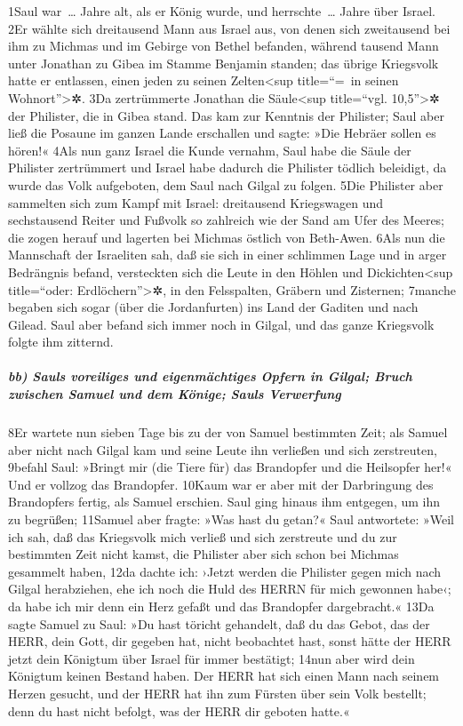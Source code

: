 1Saul war~\ldots{} Jahre alt, als er König wurde, und herrschte~\ldots{}
Jahre über Israel. 2Er wählte sich dreitausend Mann aus Israel aus, von
denen sich zweitausend bei ihm zu Michmas und im Gebirge von Bethel
befanden, während tausend Mann unter Jonathan zu Gibea im Stamme
Benjamin standen; das übrige Kriegsvolk hatte er entlassen, einen jeden
zu seinen Zelten\textless sup title=``=~in seinen
Wohnort''\textgreater✲. 3Da zertrümmerte Jonathan die Säule\textless sup
title=``vgl. 10,5''\textgreater✲ der Philister, die in Gibea stand. Das
kam zur Kenntnis der Philister; Saul aber ließ die Posaune im ganzen
Lande erschallen und sagte: »Die Hebräer sollen es hören!« 4Als nun ganz
Israel die Kunde vernahm, Saul habe die Säule der Philister zertrümmert
und Israel habe dadurch die Philister tödlich beleidigt, da wurde das
Volk aufgeboten, dem Saul nach Gilgal zu folgen. 5Die Philister aber
sammelten sich zum Kampf mit Israel: dreitausend Kriegswagen und
sechstausend Reiter und Fußvolk so zahlreich wie der Sand am Ufer des
Meeres; die zogen herauf und lagerten bei Michmas östlich von Beth-Awen.
6Als nun die Mannschaft der Israeliten sah, daß sie sich in einer
schlimmen Lage und in arger Bedrängnis befand, versteckten sich die
Leute in den Höhlen und Dickichten\textless sup title=``oder:
Erdlöchern''\textgreater✲, in den Felsspalten, Gräbern und Zisternen;
7manche begaben sich sogar (über die Jordanfurten) ins Land der Gaditen
und nach Gilead. Saul aber befand sich immer noch in Gilgal, und das
ganze Kriegsvolk folgte ihm zitternd.

\hypertarget{bb-sauls-voreiliges-und-eigenmuxe4chtiges-opfern-in-gilgal-bruch-zwischen-samuel-und-dem-kuxf6nige-sauls-verwerfung}{%
\subparagraph{bb) Sauls voreiliges und eigenmächtiges Opfern in Gilgal;
Bruch zwischen Samuel und dem Könige; Sauls
Verwerfung}\label{bb-sauls-voreiliges-und-eigenmuxe4chtiges-opfern-in-gilgal-bruch-zwischen-samuel-und-dem-kuxf6nige-sauls-verwerfung}}

8Er wartete nun sieben Tage bis zu der von Samuel bestimmten Zeit; als
Samuel aber nicht nach Gilgal kam und seine Leute ihn verließen und sich
zerstreuten, 9befahl Saul: »Bringt mir (die Tiere für) das Brandopfer
und die Heilsopfer her!« Und er vollzog das Brandopfer. 10Kaum war er
aber mit der Darbringung des Brandopfers fertig, als Samuel erschien.
Saul ging hinaus ihm entgegen, um ihn zu begrüßen; 11Samuel aber fragte:
»Was hast du getan?« Saul antwortete: »Weil ich sah, daß das Kriegsvolk
mich verließ und sich zerstreute und du zur bestimmten Zeit nicht kamst,
die Philister aber sich schon bei Michmas gesammelt haben, 12da dachte
ich: ›Jetzt werden die Philister gegen mich nach Gilgal herabziehen, ehe
ich noch die Huld des HERRN für mich gewonnen habe‹; da habe ich mir
denn ein Herz gefaßt und das Brandopfer dargebracht.« 13Da sagte Samuel
zu Saul: »Du hast töricht gehandelt, daß du das Gebot, das der HERR,
dein Gott, dir gegeben hat, nicht beobachtet hast, sonst hätte der HERR
jetzt dein Königtum über Israel für immer bestätigt; 14nun aber wird
dein Königtum keinen Bestand haben. Der HERR hat sich einen Mann nach
seinem Herzen gesucht, und der HERR hat ihn zum Fürsten über sein Volk
bestellt; denn du hast nicht befolgt, was der HERR dir geboten hatte.«

